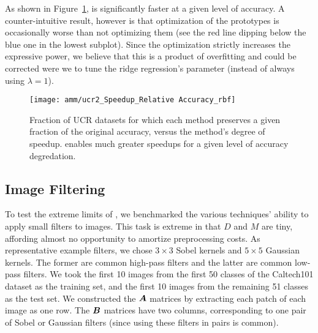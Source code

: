 As shown in Figure~\ref{fig:ucr}, \oursp is significantly faster at a given level of accuracy. A counter-intuitive result, however is that optimization of the prototypes is occasionally worse than not optimizing them (see the red line dipping below the blue one in the lowest subplot). Since the optimization strictly increases the expressive power, we believe that this is a product of overfitting and could be corrected were we to tune the ridge regression's parameter (instead of always using $\lambda = 1$). %

\begin{figure}[h]
\begin{center}
\texttt{[image: amm/ucr2\_Speedup\_Relative Accuracy\_rbf]}
\caption{Fraction of UCR datasets for which each method preserves a given fraction of the original accuracy, versus the method's degree of speedup. \oursp enables much greater speedups for a given level of accuracy degredation.}
\label{fig:ucr}
\end{center}
\end{figure}

\subsection{Image Filtering}

To test the extreme limits of \ours, we benchmarked the various techniques' ability to apply small filters to images. This task is extreme in that $D$ and $M$ are tiny, affording almost no opportunity to amortize preprocessing costs. As representative example filters, we chose $3 \times 3$ Sobel kernels and $5 \times 5$ Gaussian kernels. The former are common high-pass filters and the latter are common low-pass filters. We took the first 10 images from the first 50 classes of the Caltech101 dataset as the training set, and the first 10 images from the remaining 51 classes as the test set. We constructed the $\bm{A}$ matrices by extracting each patch of each image as one row. The $\bm{B}$ matrices have two columns, corresponding to one pair of Sobel or Gaussian filters (since using these filters in pairs is common). %


